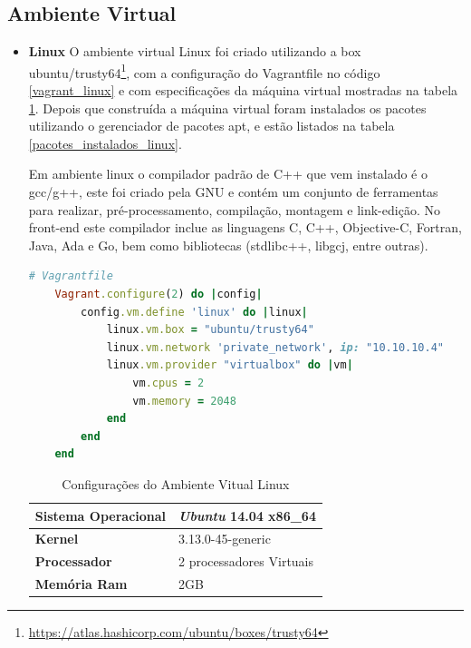 \subsection{Ambiente Virtual}

\begin{itemize}

    \item \textbf{Linux}
        \subitem  O ambiente virtual Linux foi criado utilizando a box
 ubuntu/trusty64\footnote{\url{https://atlas.hashicorp.com/ubuntu/boxes/trusty64}},
 com a configuração do Vagrantfile no código \ref{vagrant_linux} e com especificações
 da máquina virtual mostradas na tabela \ref{especificacoes_linux}.
 Depois que construída a máquina virtual foram instalados os pacotes utilizando o
 gerenciador de pacotes apt, e estão listados na tabela \ref{pacotes_instalados_linux}.

Em ambiente linux o compilador padrão de C++ que vem instalado é o gcc/g++, este foi
 criado pela GNU e contém um conjunto de ferramentas para realizar, pré-processamento,
 compilação, montagem e link-edição. No front-end este compilador inclue as linguagens C,
 C++, Objective-C, Fortran, Java, Ada e Go, bem como bibliotecas
 (stdlibc++, libgcj, entre outras).


\begin{lstlisting}[language=ruby, caption={Vagrantfile com configurações da máquina virtual linux},
                  label=vagrant_linux]
    # Vagrantfile
    Vagrant.configure(2) do |config|
        config.vm.define 'linux' do |linux|
            linux.vm.box = "ubuntu/trusty64"
            linux.vm.network 'private_network', ip: "10.10.10.4"
            linux.vm.provider "virtualbox" do |vm| 
                vm.cpus = 2
                vm.memory = 2048
            end
        end              
    end
\end{lstlisting}

\begin{table}[h]
\centering
\begin{tabular}{ll}
\textbf{Sistema Operacional} & \textit{Ubuntu} 14.04 x86\_64 \\ \toprule
\textbf{Kernel} & 3.13.0-45-generic  \\ \midrule 
\textbf{Processador} & 2 processadores Virtuais \\ \midrule
\textbf{Memória Ram} & 2GB  \\ \bottomrule 
\end{tabular} 
\caption{Configurações do Ambiente Vitual Linux}
\label{especificacoes_linux}
\end{table}


\end{itemize}
